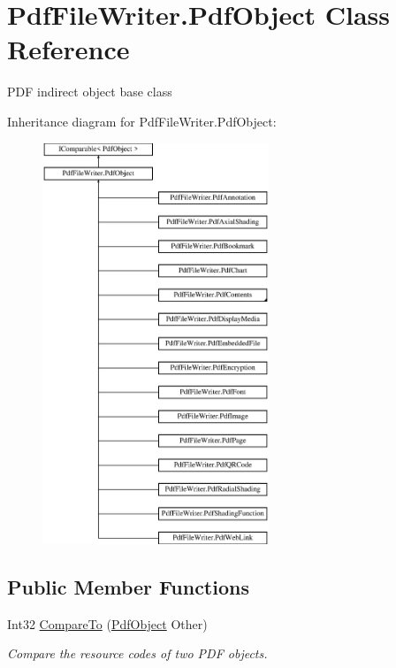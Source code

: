 \hypertarget{class_pdf_file_writer_1_1_pdf_object}{}\section{Pdf\+File\+Writer.\+Pdf\+Object Class Reference}
\label{class_pdf_file_writer_1_1_pdf_object}


P\+DF indirect object base class  


Inheritance diagram for Pdf\+File\+Writer.\+Pdf\+Object\+:\begin{figure}[H]
\begin{center}
\leavevmode
\includegraphics[height=12.000000cm]{class_pdf_file_writer_1_1_pdf_object}
\end{center}
\end{figure}
\subsection*{Public Member Functions}
\begin{DoxyCompactItemize}
\item 
Int32 \hyperlink{class_pdf_file_writer_1_1_pdf_object_a63e2527d934d0aa61f6637613c58a9a8}{Compare\+To} (\hyperlink{class_pdf_file_writer_1_1_pdf_object}{Pdf\+Object} Other)
\begin{DoxyCompactList}\small\item\em Compare the resource codes of two P\+DF objects. \end{DoxyCompactList}\end{DoxyCompactItemize}


